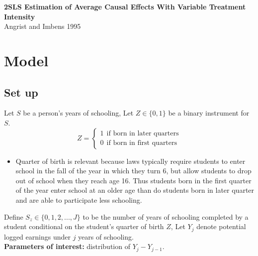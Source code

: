 \documentclass[a4paper,11pt]{article}
\begin{document}
\begin{center}
{ \normalfont \Large \textbf{2SLS Estimation of Average Causal Effects With Variable Treatment Intensity} }\\
\vspace{3mm}
{ \large {Angrist and Imbens 1995} }
\end{center}

\section{Model}
\subsection{Set up}
Let $S$ be a person's years of schooling, Let $Z\in\{0,1\}$ be a binary instrument for $S$. 
\[Z=\begin{cases} 1 \ \ \text{if born in later quarters} \\ 0 \ \ \text{if born in first quarters}\end{cases} \]
\begin{itemize}
\item
Quarter of birth is relevant because laws typically require students to enter school in the fall of the year in which they turn 6, but allow students to drop out of school when they reach age 16. Thus students born in the first quarter of the year enter school at an older age than do students born in later quarter and are able to participate less schooling.
\end{itemize}
Define $S_z \in \{0,1,2,...,J\}$ to be the number of years of schooling completed by a student conditional on the student's quarter of birth $Z$, Let $Y_j$ denote potential logged earnings under $j$ years of schooling. \\
\textbf{Parameters of interest:} distribution of $Y_j-Y_{j-1}$.
\end{document}
